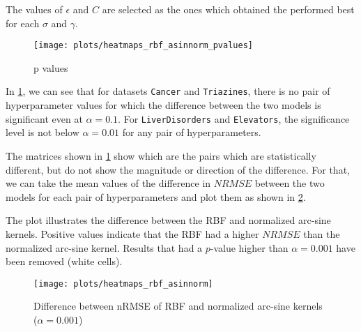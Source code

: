 The values of $\epsilon$ and $C$ are selected as the ones which obtained
the performed best for each $\sigma$ and $\gamma$.

\begin{figure}[H]
    \texttt{[image: plots/heatmaps\_rbf\_asinnorm\_pvalues]}
    \caption{p values}
    \label{fig:paired-ttest-rbf-asinnorm}
\end{figure}

In \cref{fig:paired-ttest-rbf-asinnorm}, we can see that for datasets
\texttt{Cancer} and \texttt{Triazines}, there is no pair of hyperparameter
values for which the difference between the two models is significant even at
$\alpha=0.1$. For \texttt{LiverDisorders} and \texttt{Elevators}, the significance
level is not below $\alpha=0.01$ for any pair of hyperparameters.

The matrices shown in \cref{fig:paired-ttest-rbf-asinnorm} show which are the
pairs which are statistically different, but do not show the magnitude or
direction of the difference. For that, we can take the mean values of
the difference in $NRMSE$ between the two models for each pair of hyperparameters
and plot them as shown in \cref{fig:paired-ttest-rbf-asinnorm-diff}.

The plot illustrates the difference between the RBF and normalized arc-sine
kernels. Positive values indicate that the RBF had a higher $NRMSE$ than the
normalized arc-sine kernel. Results that had a $p$-value higher than $\alpha=0.001$
have been removed (white cells).

\begin{figure}[H]
    \texttt{[image: plots/heatmaps\_rbf\_asinnorm]}
    \caption{Difference between nRMSE of RBF and normalized arc-sine kernels ($\alpha=0.001$)}
    \label{fig:paired-ttest-rbf-asinnorm-diff}
\end{figure}

